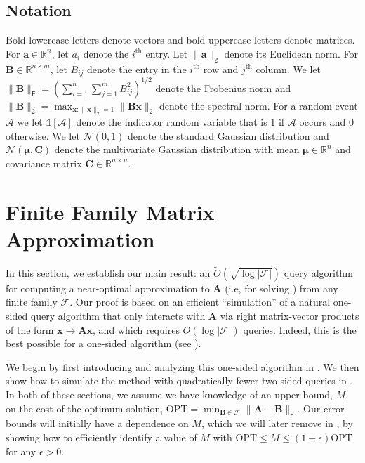 \documentclass{article}[11pt]
\theoremstyle{definition}
\newcommand{\ones}{\mathds{1}}
\newcommand{\norm}[1]{\|#1\|}
\newcommand{\bv}[1]{\boldsymbol{\mathbf{#1}}}
\newcommand{\R}{\mathbb{R}}
\newcommand{\Fro}{\mathsf{F}}
\newcommand{\OPT}{\mathrm{OPT}}
\begin{document}
\subsection{Notation}
Bold lowercase letters denote vectors and bold uppercase letters denote matrices. 
    For $\bv a \in \R^n$, let $a_i$ denote the $i^\text{th}$ entry. Let $\norm{\bv a}_2$ denote its Euclidean norm. For $\bv B \in \R^{n \times m}$, let $B_{ij}$ denote the entry in the $i^\text{th}$ row and $j^\text{th}$ column. We let $\|\bv{B}\|_\Fro=(\sum_{i=1}^n \sum_{j=1}^m B_{ij}^2)^{1/2}$ denote the Frobenius norm and $\| \bv B \|_2 =  \max_{\bv x: \norm{\bv x}_2 = 1} \norm{\bv B \bv x}_2$ denote the spectral norm. 
    For a random event $\mathcal{A}$ we let $\ones[\mathcal{A}]$ denote the indicator random variable that is $1$ if $\mathcal{A}$ occurs and $0$ otherwise. We let $\mathcal{N}(0,1)$ denote the standard Gaussian distribution and $\mathcal{N}(\bv \mu, \bv C)$ denote the multivariate Gaussian distribution with mean $\bv \mu \in \R^{n}$ and covariance matrix $\bv C \in  \R^{n\times n}$. 


\section{Finite Family Matrix Approximation}\label{sec:finite}
    In this section, we establish our main result: an $\tilde{O}(\sqrt{\log |\mathcal{F}|})$ query algorithm for computing a near-optimal approximation to $\bv{A}$ (i.e, for solving ) from any finite family $\mathcal{F}$. Our proof is based on an efficient ``simulation'' of a natural one-sided query algorithm that only interacts with $\bv{A}$ via right matrix-vector products of the form $\bv x \rightarrow \bv{A}\bv{x}$, and which requires ${O}({\log |\mathcal{F}|})$ queries. Indeed, this is the best possible for a one-sided algorithm (see ).

     We begin by first introducing and analyzing this one-sided algorithm in . We then show how to simulate the method with quadratically fewer two-sided queries in . In both of these sections, we assume we have knowledge of an upper bound, $M$, on the {cost} of the optimum solution, $\OPT = \min_{\bv{B}\in \mathcal{F}} \|\bv{A} - \bv{B}\|_\Fro$. Our error bounds will initially have a dependence on $M$, which we will later remove in , by showing how to efficiently identify a value of $M$ with $\OPT \leq M \leq (1+\epsilon)\OPT$ for any $\epsilon > 0$. 
\end{document}
